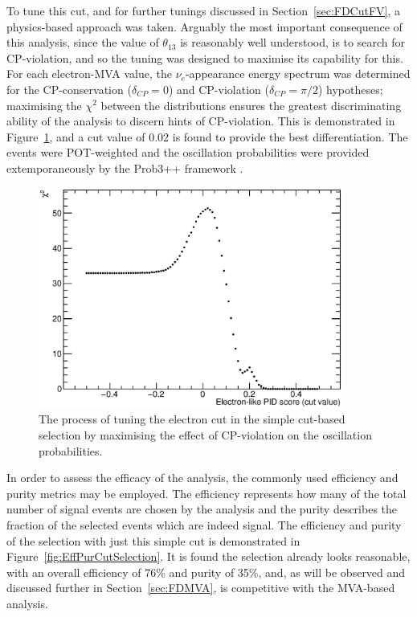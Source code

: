 To tune this cut, and for further tunings discussed in Section~\ref{sec:FDCutFV}, a physics-based approach was taken.  Arguably the most important consequence of this analysis, since the value of $\theta_{13}$ is reasonably well understood, is to search for CP-violation, and so the tuning was designed to maximise its capability for this.  For each electron-MVA value, the $\nu_e$-appearance energy spectrum was determined for the CP-conservation ($\delta_{CP}=0$) and CP-violation ($\delta_{CP}=\pi/2$) hypotheses; maximising the $\chi^2$ between the distributions ensures the greatest discriminating ability of the analysis to discern hints of CP-violation.  This is demonstrated in Figure~\ref{fig:ElectronMVATune}, and a cut value of 0.02 is found to provide the best differentiation.  The events were POT-weighted and the oscillation probabilities were provided extemporaneously by the Prob3++ framework \cite{Prob3++}.

\begin{figure}
  \centering
  \includegraphics[width=10cm]{ElectronMVATune.eps}
  \caption[The process of tuning the electron cut in the simple cut-based selection by maximising the effect of CP-violation on the oscillation probabilities.]{The process of tuning the electron cut in the simple cut-based selection by maximising the effect of CP-violation on the oscillation probabilities.}
  \label{fig:ElectronMVATune}
\end{figure}

In order to assess the efficacy of the analysis, the commonly used efficiency and purity metrics may be employed.  The efficiency represents how many of the total number of signal events are chosen by the analysis and the purity describes the fraction of the selected events which are indeed signal.  The efficiency and purity of the selection with just this simple cut is demonstrated in Figure~\ref{fig:EffPurCutSelection}.  It is found the selection already looks reasonable, with an overall efficiency of 76\% and purity of 35\%, and, as will be observed and discussed further in Section~\ref{sec:FDMVA}, is competitive with the MVA-based analysis.


